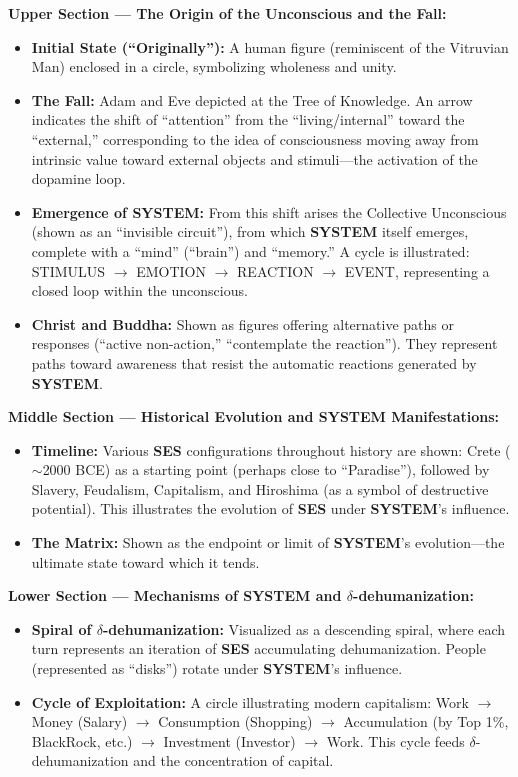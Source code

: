 \documentclass[11pt,a4paper]{article}
\newcommand{\SYSTEM}{\textbf{SYSTEM}}
\newcommand{\SES}{\textbf{SES}}
\newcommand{\deltaDehum}{$\delta$-dehumanization}
\theoremstyle{definition}
\theoremstyle{remark}
\begin{document}
\textbf{Upper Section --- The Origin of the Unconscious and the Fall:}
\begin{itemize}
    \item \textbf{Initial State (``Originally''):} A human figure (reminiscent of the Vitruvian Man) enclosed in a circle, symbolizing wholeness and unity.
    \item \textbf{The Fall:} Adam and Eve depicted at the Tree of Knowledge. An arrow indicates the shift of ``attention'' from the ``living/internal'' toward the ``external,'' corresponding to the idea of consciousness moving away from intrinsic value toward external objects and stimuli---the activation of the dopamine loop.
    \item \textbf{Emergence of \SYSTEM{}:} From this shift arises the Collective Unconscious (shown as an ``invisible circuit''), from which \SYSTEM{} itself emerges, complete with a ``mind'' (``brain'') and ``memory.'' A cycle is illustrated: STIMULUS $\to$ EMOTION $\to$ REACTION $\to$ EVENT, representing a closed loop within the unconscious.
    \item \textbf{Christ and Buddha:} Shown as figures offering alternative paths or responses (``active non-action,'' ``contemplate the reaction''). They represent paths toward awareness that resist the automatic reactions generated by \SYSTEM{}.
\end{itemize}

\textbf{Middle Section --- Historical Evolution and \SYSTEM{} Manifestations:}
\begin{itemize}
    \item \textbf{Timeline:} Various \SES{} configurations throughout history are shown: Crete ($\sim$2000 BCE) as a starting point (perhaps close to ``Paradise''), followed by Slavery, Feudalism, Capitalism, and Hiroshima (as a symbol of destructive potential). This illustrates the evolution of \SES{} under \SYSTEM{}'s influence.
    \item \textbf{The Matrix:} Shown as the endpoint or limit of \SYSTEM{}'s evolution---the ultimate state toward which it tends.
\end{itemize}

\textbf{Lower Section --- Mechanisms of \SYSTEM{} and \deltaDehum{}:}
\begin{itemize}
    \item \textbf{Spiral of \deltaDehum{}:} Visualized as a descending spiral, where each turn represents an iteration of \SES{} accumulating dehumanization. People (represented as ``disks'') rotate under \SYSTEM{}'s influence.
    \item \textbf{Cycle of Exploitation:} A circle illustrating modern capitalism: Work $\to$ Money (Salary) $\to$ Consumption (Shopping) $\to$ Accumulation (by Top 1\%, BlackRock, etc.) $\to$ Investment (Investor) $\to$ Work. This cycle feeds \deltaDehum{} and the concentration of capital.
\end{itemize}
\end{document}
